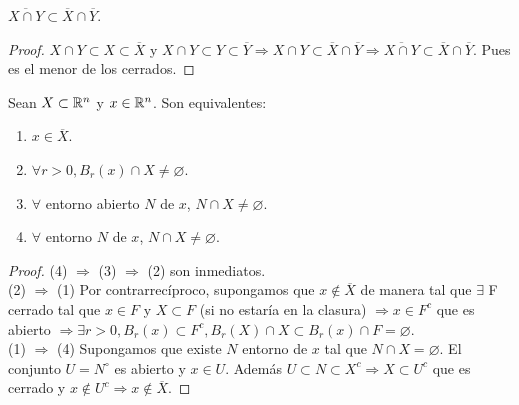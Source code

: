 \begin{prop}
  \(\overline{X \cap Y} \subset \overline{X} \cap \overline{Y} \).
  \begin{proof}
    \(X \cap Y \subset X \subset \overline{X} \) y \(X \cap Y \subset Y \subset \overline{Y} \Rightarrow X \cap Y \subset \overline{X} \cap \overline{Y} \Rightarrow \overline{X \cap Y} \subset \overline{X} \cap \overline{Y} \). Pues es el menor de los cerrados.
  \end{proof}
\end{prop}

\begin{prop}
  Sean \(X \subset \mathbb{R}^n\) y \(x \in \mathbb{R}^n\). Son equivalentes:
  \begin{enumerate}
    \item \(x \in \overline{X} \).
    \item \(\forall r > 0, B_r(x) \cap X \neq \varnothing \).
    \item \(\forall \) entorno abierto \(N\) de \(x\), \(N \cap X \neq \varnothing \).
    \item \(\forall \) entorno \(N\) de \(x\), \(N \cap X \neq \varnothing \).
  \end{enumerate}

  \begin{proof}
    (4) \(\Rightarrow \) (3) \(\Rightarrow \) (2) son inmediatos. \\
    (2) \(\Rightarrow \) (1) Por contrarrecíproco, supongamos que \(x \notin \overline{X} \) de manera tal que \(\exists \) F cerrado tal que \(x \in F\) y \(X \subset F\) (si no estaría en la clasura) \(\Rightarrow x \in F^c\) que es abierto \(\Rightarrow \exists r > 0, B_r(x) \subset F^c, B_r(X) \cap X \subset B_r(x) \cap F = \varnothing \). \\
    (1) \(\Rightarrow \) (4) Supongamos que existe \(N\) entorno de \(x\) tal que \(N \cap X = \varnothing \). El conjunto \(U = N^{\circ} \) es abierto y \(x \in U\). Además \(U \subset N \subset X^c \Rightarrow X \subset U^c\) que es cerrado y \(x \notin U^c \Rightarrow x \notin \overline{X} \).
  \end{proof}
\end{prop}


